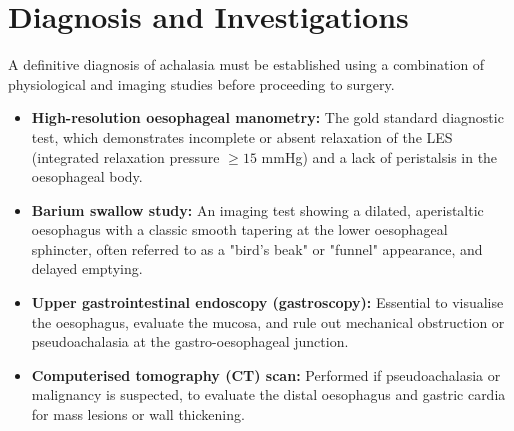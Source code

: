 \section*{Diagnosis and Investigations}
A definitive diagnosis of achalasia must be established using a combination of physiological and imaging studies before proceeding to surgery.
\begin{itemize}
    \item \textbf{High-resolution oesophageal manometry:} The gold standard diagnostic test, which demonstrates incomplete or absent relaxation of the LES (integrated relaxation pressure $\ge 15$ mmHg) and a lack of peristalsis in the oesophageal body.
    \item \textbf{Barium swallow study:} An imaging test showing a dilated, aperistaltic oesophagus with a classic smooth tapering at the lower oesophageal sphincter, often referred to as a "bird's beak" or "funnel" appearance, and delayed emptying.
    \item \textbf{Upper gastrointestinal endoscopy (gastroscopy):} Essential to visualise the oesophagus, evaluate the mucosa, and rule out mechanical obstruction or pseudoachalasia at the gastro-oesophageal junction.
    \item \textbf{Computerised tomography (CT) scan:} Performed if pseudoachalasia or malignancy is suspected, to evaluate the distal oesophagus and gastric cardia for mass lesions or wall thickening.
\end{itemize}

